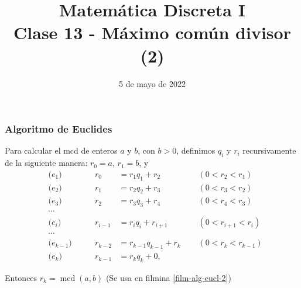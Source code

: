 \documentclass[handout]{beamer} %
\title[Clase 12 - MCD (2)]{Matemática Discreta I \\ Clase 13 - Máximo común divisor (2)}
\institute[]{\normalsize FAMAF / UNC
    \\[\baselineskip] ${}^{}$
    \\[\baselineskip]
}
\date[05/05/2022]{5 de mayo  de 2022}
\newcommand{\mcd}{\operatorname{mcd}}
\begin{document}
    
    \frame{\titlepage} 
    
    
    
    \begin{frame}\frametitle{Algoritmo de Euclides}\label{film-alg-eucl}
        Para calcular el mcd de enteros $a$ y $b$, con $b >0$, 
        definimos $q_i$ y $r_i$ recursivamente  de la siguiente manera: $r_0 = a$, $r_1 = b$,  y \pause
        \begin{align*}
            &\text{($e_{1}$)}\qquad& r_0&=r_1 q_1 + r_2& &(0 < r_2<r_1)\\
            &\text{($e_{2}$)}\qquad& r_1&=r_2q_2 + r_3\quad{}\quad{}\quad{}& &(0 < r_3<r_2)  \\
            &\text{($e_{3}$)}\qquad& r_2&=r_3q_3 + r_4\quad{}\quad{}\quad{}& &(0 < r_4<r_3)  \\
            &\cdots&&\\
            &\text{($e_{i}$)}\qquad& r_{i-1}&=r_{i}q_{i} + r_{i+1}& &(0 < r_{i+1} <r_{i}) \\
            &\cdots&& \\
            &\text{($e_{k-1}$)}\qquad& r_{k-2}&=r_{k-1}q_{k-1} + r_{k}& &(0 < r_{k} <r_{k-1}) \\
            &\text{($e_{k}$)}\qquad& r_{k-1}&=r_{k}q_{k} + 0 ,&&  
        \end{align*}\pause
        
        Entonces $r_k = \mcd(a,b)$ {\color{gray} \qquad (Se usa en filmina \ref{film-alg-eucl-2})}
    \end{frame}

    
\end{document}

